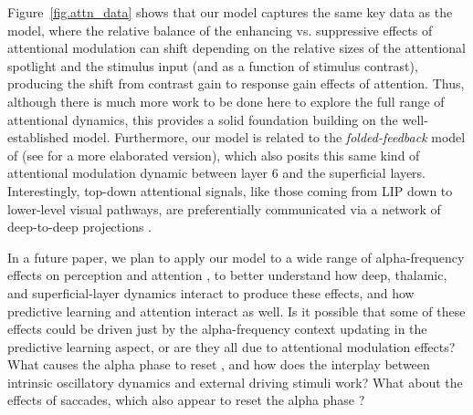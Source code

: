 \documentclass[11pt,twoside]{article}
\newif\myifpdf
\begin{document}
Figure~\ref{fig.attn_data} shows that our model captures the same key data as the  model, where the relative balance of the enhancing vs. suppressive effects of attentional modulation can shift depending on the relative sizes of the attentional spotlight and the stimulus input (and as a function of stimulus contrast), producing the shift from contrast gain to response gain effects of attention.  Thus, although there is much more work to be done here to explore the full range of attentional dynamics, this provides a solid foundation building on the well-established  model.  Furthermore, our model is related to the {\em folded-feedback} model of  (see  for a more elaborated version), which also posits this same kind of attentional modulation dynamic between layer 6 and the superficial layers.  Interestingly, top-down attentional signals, like those coming from LIP down to lower-level visual pathways, are preferentially communicated via a network of deep-to-deep projections .

In a future paper, we plan to apply our model to a wide range of alpha-frequency effects on perception and attention \cite{NunnOsselton74,VarelaToroJohnEtAl81,VanRullenKoch03,KlimeschSausengHanslmayr07,BuschDuboisVanRullen09,MathewsonFabianiGrattonEtAl10,JensenMazaheri10,VanrullenDubois11,PalvaPalva11,RohenkohlNobre11,JensenBonnefondVanRullen12,JensenGipsBergmannEtAl14}, to better understand how deep, thalamic, and superficial-layer dynamics interact to produce these effects, and how predictive learning and attention interact as well.  Is it possible that some of these effects could be driven just by the alpha-frequency context updating in the predictive learning aspect, or are they all due to attentional modulation effects?  What causes the alpha phase to reset \cite{CalderoneLakatosButlerEtAl14}, and how does the interplay between intrinsic oscillatory dynamics and external driving stimuli work?   What about the effects of saccades, which also appear to reset the alpha phase  \cite{MelloniSchwiedrzikRodriguezEtAl09,ParadisoMeshiPisarcikEtAl12,MaldonadoBabulSingerEtAl08,RajkaiLakatosChenEtAl08,ItoMaldonadoSingerEtAl11}?
\end{document}
